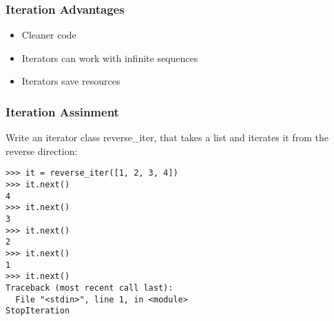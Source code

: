 \begin{frame}[fragile]\frametitle{Iteration Advantages}
    \begin{itemize}
    \item Cleaner code
    \item     Iterators can work with infinite sequences
    \item     Iterators save resources
    \end{itemize}
   \end{frame}
   
\begin{frame}[fragile]\frametitle{Iteration Assinment}
Write an iterator class reverse\_iter, that takes a list and iterates it from the reverse direction:
\begin{lstlisting}
>>> it = reverse_iter([1, 2, 3, 4])
>>> it.next()
4
>>> it.next()
3
>>> it.next()
2
>>> it.next()
1
>>> it.next()
Traceback (most recent call last):
  File "<stdin>", line 1, in <module>
StopIteration
\end{lstlisting}
\end{frame}





